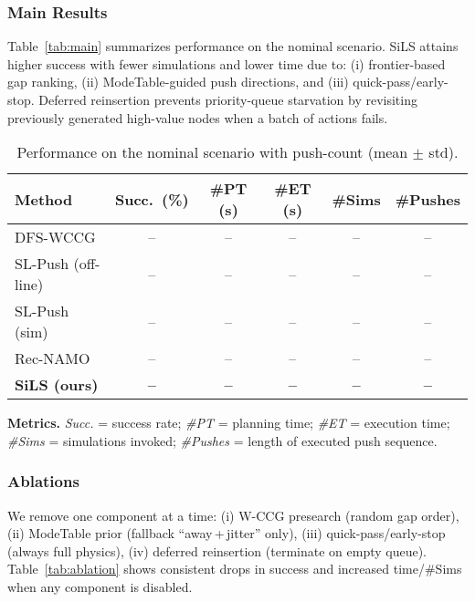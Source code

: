 \subsubsection{Main Results}
\label{subsec:main-results}
Table~\ref{tab:main} summarizes performance on the nominal scenario.
SiLS attains higher success with fewer simulations and lower time due to:
(i) frontier-based gap ranking, (ii) ModeTable-guided push directions,
and (iii) quick-pass/early-stop. Deferred reinsertion prevents
priority-queue starvation by revisiting previously generated high-value
nodes when a batch of actions fails.

\begin{table}[t]
\centering
\begin{threeparttable}
\caption{Performance on the nominal scenario with push-count (mean $\pm$ std).}
\label{tab:main-push}
\vspace{2pt}
\begin{tabular}{lccccc}
\toprule
Method & Succ.~(\%) & \#PT (s) & \#ET (s) & \#Sims & \#Pushes \\
\midrule
DFS-WCCG            & -- & -- & -- & -- & -- \\
SL-Push (off-line)  & -- & -- & -- & -- & -- \\
SL-Push (sim)       & -- & -- & -- & -- & -- \\
Rec-NAMO            & -- & -- & -- & -- & -- \\
\textbf{SiLS (ours)}& \textbf{--} & \textbf{--} & \textbf{--} & \textbf{--} & \textbf{--} \\
\bottomrule
\end{tabular}
\begin{tablenotes}[flushleft]\footnotesize
\item \textbf{Metrics.} \emph{Succ.} = success rate; \emph{\#PT} = planning time; \emph{\#ET} = execution time;
\emph{\#Sims} = simulations invoked; \emph{\#Pushes} = length of executed push sequence.
\end{tablenotes}
\end{threeparttable}
\end{table}


\subsubsection{Ablations}
\label{subsec:ablations}
We remove one component at a time: (i) W-CCG presearch (random gap order),
(ii) ModeTable prior (fallback “away\,+\,jitter” only),
(iii) quick-pass/early-stop (always full physics),
(iv) deferred reinsertion (terminate on empty queue).
Table~\ref{tab:ablation} shows consistent drops in success and increased
time/\#Sims when any component is disabled.

